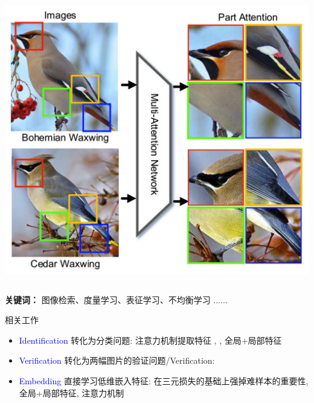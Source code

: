 \documentclass[notes]{beamer}
\begin{document}
\begin{frame}
\begin{columns}
		\includegraphics[width=\textwidth]{2018-03-15-21-58-38.png}

	\end{columns}
	{\bf 关键词：} 图像检索、度量学习、表征学习、不均衡学习 ......
\end{frame}

\begin{frame}
	{相关工作}
	\begin{itemize}
		\item {\textcolor{blue}{Identification}} 转化为分类问题: 注意力机制提取特征 \cite{liu2017hydraplus}, \cite{zhao2017spindle}, 全局+局部特征 \cite{wei2017glad}
		\item {\textcolor{blue}{Verification}} 转化为两幅图片的验证问题/Verification: \cite{Yaqing2016}
		\item {\textcolor{blue}{Embedding}} 直接学习低维嵌入特征: 在三元损失的基础上强掉难样本的重要性\cite{hermans2017defense}, 全局+局部特征\cite{zhang2017align}, 注意力机制\cite{DBLP:journals/corr/ZhaoLWZ17} 
	\end{itemize}
\end{frame}
\end{document}
